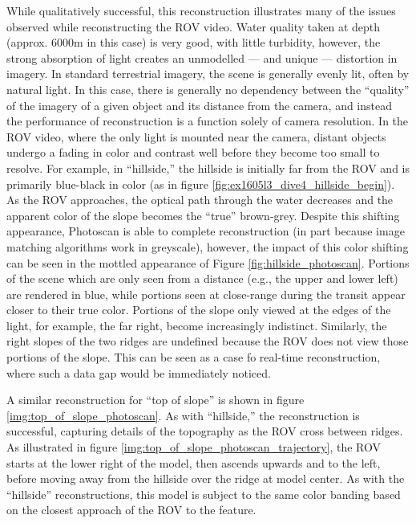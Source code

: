 \documentclass[letterpaper,12pt]{article}
\begin{document}
While qualitatively successful, this reconstruction illustrates many of the issues observed while reconstructing the ROV video.    Water quality taken at depth (approx. 6000m in this case) is very good, with little turbidity, however, the strong absorption of light creates an unmodelled --- and unique --- distortion in imagery.   In standard terrestrial imagery, the scene is generally evenly lit, often by natural light.   In this case, there is generally no dependency between the ``quality'' of the imagery of a given object and its distance from the camera, and instead the performance of reconstruction is a function solely of camera resolution.   In the ROV video, where the only light is mounted near the camera, distant objects undergo a fading in color and contrast well before they become too small to resolve.   For example, in ``hillside,'' the hillside is initially far from the ROV and is primarily blue-black in color (as in figure \ref{fig:ex1605l3_dive4_hillside_begin}).  As the ROV approaches, the optical path through the water decreases and the apparent color of the slope becomes the ``true'' brown-grey.   Despite this shifting appearance, Photoscan is able to complete reconstruction (in part because image matching algorithms work in greyscale), however, the impact of this color shifting can be seen in the mottled appearance of Figure \ref{fig:hillside_photoscan}. 
Portions of the scene which are only seen from a distance (e.g., the upper and lower left) are rendered in blue, while portions seen at close-range during the transit appear closer to their true color.   Portions of the slope only viewed at the edges of the light, for example, the far right, become increasingly indistinct.  Similarly, the right slopes of the two ridges are undefined because the ROV does not view those portions of the slope.   This can be seen as a case fo real-time reconstruction, where such a data gap would be immediately noticed.

A similar reconstruction for ``top of slope'' is shown in figure \ref{img:top_of_slope_photoscan}.  As with ``hillside,'' the reconstruction is successful, capturing details of the topography as the ROV cross between ridges.   As illustrated in figure \ref{img:top_of_slope_photoscan_trajectory}, the ROV starts at the lower right of the model, then ascends upwards and to the left, before moving away from the hillside over the ridge at model center.  As with the ``hillside'' reconstructions, this model is subject to the same color banding based on the closest approach of the ROV to the feature.
\end{document}
